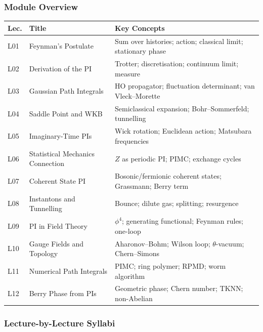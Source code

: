 \documentclass[11pt,a4paper]{article}
\begin{document}
\subsubsection*{Module Overview}
{\footnotesize
\begin{center}
\begin{tabular}{@{}lp{4.2cm}p{6.8cm}@{}}
\toprule
\textbf{Lec.} & \textbf{Title} & \textbf{Key Concepts}\\
\midrule
L01 & Feynman's Postulate & Sum over histories; action; classical limit; stationary phase\\
L02 & Derivation of the PI & Trotter; discretisation; continuum limit; measure\\
L03 & Gaussian Path Integrals & HO propagator; fluctuation determinant; van Vleck--Morette\\
L04 & Saddle Point and WKB & Semiclassical expansion; Bohr--Sommerfeld; tunnelling\\
L05 & Imaginary-Time PIs & Wick rotation; Euclidean action; Matsubara frequencies\\
L06 & Statistical Mechanics Connection & $Z$ as periodic PI; PIMC; exchange cycles\\
\midrule
L07 & Coherent State PI & Bosonic/fermionic coherent states; Grassmann; Berry term\\
L08 & Instantons and Tunnelling & Bounce; dilute gas; splitting; resurgence\\
L09 & PI in Field Theory & $\phi^4$; generating functional; Feynman rules; one-loop\\
L10 & Gauge Fields and Topology & Aharonov--Bohm; Wilson loop; $\theta$-vacuum; Chern--Simons\\
L11 & Numerical Path Integrals & PIMC; ring polymer; RPMD; worm algorithm\\
L12 & Berry Phase from PIs & Geometric phase; Chern number; TKNN; non-Abelian\\
\bottomrule
\end{tabular}
\end{center}
}

\subsubsection*{Lecture-by-Lecture Syllabi}
\end{document}
